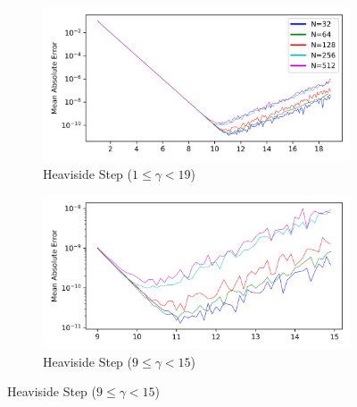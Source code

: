 \documentclass[a4paper]{report}
\begin{document}
\begin{figure}[H]
    \begin{subfigure}{.45\linewidth}
      \includegraphics[width=\linewidth]{images/cavers/heaviside_dft.png}
      \caption{Heaviside Step ($1 \leq \gamma < 19$)}
    \end{subfigure}\hfill
    \begin{subfigure}{.45\linewidth}
      \includegraphics[width=\linewidth]{images/cavers/heaviside_zoomed_dft.png}
      \caption{Heaviside Step ($9 \leq \gamma < 15$)}
      \label{fig:heaviside_zoomed_dft}
    \end{subfigure}
    
    \medskip
    

\end{figure}
\end{document}
